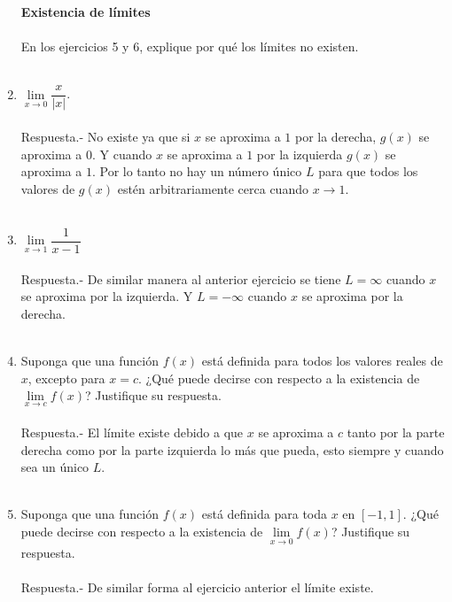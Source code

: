 \begin{enumerate}
\textbf{Existencia de límites}\\\\
En los ejercicios 5 y 6, explique por qué los límites no existen.\\\\

\item $\lim\limits_{x\to 0} \dfrac{x}{|x|}$.\\\\
    Respuesta.-\; No existe ya que si $x$ se aproxima a $1$ por la derecha, $g(x)$ se aproxima a $0$. Y cuando $x$ se aproxima a $1$ por la izquierda $g(x)$ se aproxima a $1$. Por lo tanto no hay un número único $L$ para que todos los valores de $g(x)$ estén arbitrariamente cerca cuando $x\to 1$.\\\\

\item $\lim\limits_{x\to 1} \dfrac{1}{x-1}$\\\\
    Respuesta.-\; De similar manera al anterior ejercicio se tiene $L=\infty$ cuando $x$ se aproxima por la izquierda. Y $L=-\infty$ cuando $x$ se aproxima por la derecha.\\\\

\item Suponga que una función $f(x)$ está definida para todos los valores reales de $x$, excepto para $x = c$. ¿Qué puede decirse con respecto a la existencia de $\lim\limits_{x\to c} f(x)$? Justifique su respuesta.\\\\
    Respuesta.-\; El límite existe debido a que $x$ se aproxima a $c$ tanto por la parte derecha como por la parte izquierda lo más que pueda, esto siempre y cuando sea un único $L$.\\\\ 

\item Suponga que una función $f(x)$ está definida para toda $x$ en $[-1, 1]$. ¿Qué puede decirse con respecto a la existencia de $\lim\limits_{x\to 0} f(x)$? Justifique su respuesta.\\\\
    Respuesta.-\; De similar forma al ejercicio anterior el límite existe.\\\\ 


\end{enumerate}
